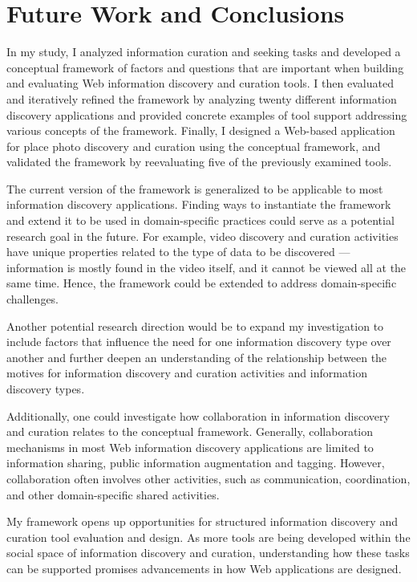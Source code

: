 \chapter{Future Work and Conclusions}
\label{chapter:future_work}


In my study, I analyzed information curation and seeking tasks and developed a conceptual framework of factors and questions that are important when building and evaluating Web information discovery and curation tools. I then evaluated and iteratively refined the framework by analyzing twenty different information discovery applications and provided concrete examples of tool support addressing various concepts of the framework. Finally, I designed a Web-based application for place photo discovery and curation using the conceptual framework, and validated the framework by reevaluating five of the previously examined tools.

The current version of the framework is generalized to be applicable to most information discovery applications. Finding ways to instantiate the framework and extend it to be used in domain-specific practices could serve as a potential research goal in the future. For example, video discovery and curation activities have unique properties related to the type of data to be discovered --- information is mostly found in the video itself, and it cannot be viewed all at the same time. Hence, the framework could be extended to address domain-specific challenges. 

Another potential research direction would be to expand my investigation to include factors that influence the need for one information discovery type over another and further deepen an understanding of the relationship between the motives for information discovery and curation activities and information discovery types. 

Additionally, one could investigate how collaboration in information discovery and curation relates to the conceptual framework. Generally, collaboration mechanisms in most Web information discovery applications are limited to information sharing, public information augmentation and tagging. However, collaboration often involves other activities, such as communication, coordination, and other domain-specific shared activities.

My framework opens up opportunities for structured information discovery and curation tool evaluation and design. As more tools are being developed within the social space of information discovery and curation, understanding how these tasks can be supported promises advancements in how Web applications are designed.




